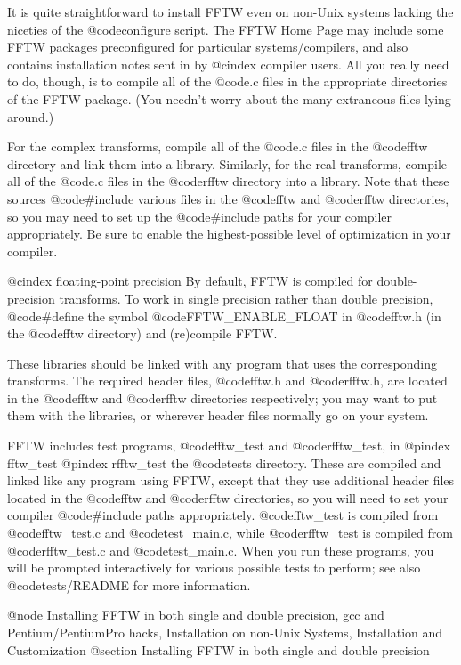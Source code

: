 It is quite straightforward to install FFTW even on non-Unix systems
lacking the niceties of the @code{configure} script.  The FFTW Home Page
may include some FFTW packages preconfigured for particular
systems/compilers, and also contains installation notes sent in by
@cindex compiler
users.  All you really need to do, though, is to compile all of the
@code{.c} files in the appropriate directories of the FFTW package.
(You needn't worry about the many extraneous files lying around.)

For the complex transforms, compile all of the @code{.c} files in the
@code{fftw} directory and link them into a library.  Similarly, for the
real transforms, compile all of the @code{.c} files in the @code{rfftw}
directory into a library.  Note that these sources @code{#include}
various files in the @code{fftw} and @code{rfftw} directories, so you
may need to set up the @code{#include} paths for your compiler
appropriately.  Be sure to enable the highest-possible level of
optimization in your compiler.

@cindex floating-point precision
By default, FFTW is compiled for double-precision transforms.  To work
in single precision rather than double precision, @code{#define} the
symbol @code{FFTW_ENABLE_FLOAT} in @code{fftw.h} (in the @code{fftw}
directory) and (re)compile FFTW.

These libraries should be linked with any program that uses the
corresponding transforms.  The required header files, @code{fftw.h} and
@code{rfftw.h}, are located in the @code{fftw} and @code{rfftw}
directories respectively; you may want to put them with the libraries,
or wherever header files normally go on your system.

FFTW includes test programs, @code{fftw_test} and @code{rfftw_test}, in
@pindex fftw_test
@pindex rfftw_test
the @code{tests} directory.  These are compiled and linked like any
program using FFTW, except that they use additional header files located
in the @code{fftw} and @code{rfftw} directories, so you will need to set
your compiler @code{#include} paths appropriately.  @code{fftw_test} is
compiled from @code{fftw_test.c} and @code{test_main.c}, while
@code{rfftw_test} is compiled from @code{rfftw_test.c} and
@code{test_main.c}.  When you run these programs, you will be prompted
interactively for various possible tests to perform; see also
@code{tests/README} for more information.

@node Installing FFTW in both single and double precision, gcc and Pentium/PentiumPro hacks, Installation on non-Unix Systems, Installation and Customization
@section Installing FFTW in both single and double precision

